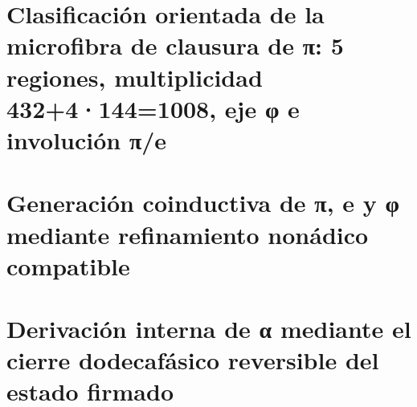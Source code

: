 


\chapter{Clasificación orientada de la microfibra de clausura de π: 5 regiones, multiplicidad 432+4·144=1008, eje φ e involución π/e}
\label{chap:sucesor-102-09}


\chapter{Generación coinductiva de π, e y φ mediante refinamiento nonádico compatible}
\label{chap:sucesor-102-10}




















\chapter{Derivación interna de α mediante el cierre dodecafásico reversible del estado firmado}
\label{chap:sucesor-102-11}



















